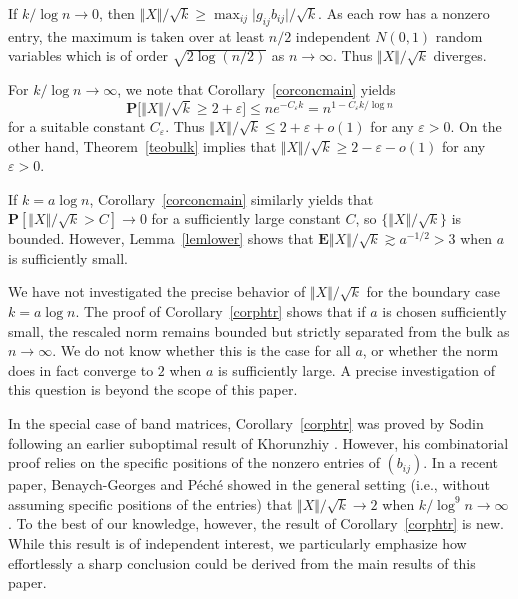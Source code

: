 \documentclass[aop,MSNbibl,dvips]{arximspdf}
\newcommand{\rrvert}{\vert}
\newcommand{\rrVert}{\Vert}
\newcommand{\llvert}{\vert}
\newcommand{\llVert}{\Vert}
\newcommand{\EE}{\mathbf{E}}
\begin{document}
\begin{pf}
If $k/\log n\to0$, then $\llVert X\rrVert /\sqrt{k}\ge
\max_{ij}\llvert g_{ij}b_{ij}\rrvert /\sqrt{k}$. As each row has a
nonzero entry,
the maximum is taken over at least $n/2$ independent $N(0,1)$ random
variables which is of order $\sqrt{2\log(n/2)}$ as $n\to\infty$.
Thus $\llVert X\rrVert /\sqrt{k}$ diverges.

For $k/\log n\to\infty$, we note that Corollary~\ref{corconcmain} yields
%
\[
\mathbf{P}\bigl[ \llVert X\rrVert/\sqrt{k}\ge2 + \varepsilon\bigr]
\le
ne^{-C_\varepsilon k} = n^{1-C_\varepsilon k/\log n} %
\]
%
for a suitable constant $C_\varepsilon$. Thus
$\llVert X\rrVert /\sqrt{k}\le2+\varepsilon+ o(1)$ for any
$\varepsilon>0$.
On the other hand, Theorem~\ref{teobulk}
implies that $\llVert X\rrVert /\sqrt{k}\ge2-\varepsilon-o(1)$ for any
$\varepsilon>0$.

If\vspace*{1pt} $k=a\log n$, Corollary~\ref{corconcmain} similarly yields
that $\mathbf{P}[\llVert X\rrVert /\sqrt{k} > C]\to0$ for a
sufficiently large
constant $C$, so $\{\llVert X\rrVert /\sqrt{k}\}$ is bounded. However,
Lemma~\ref{lemlower} shows that $\EE\llVert X\rrVert /\sqrt{k} \gtrsim
a^{-1/2}>3$ when $a$ is sufficiently small.
\end{pf}

%
\begin{rem}
We have not investigated the precise behavior of $\llVert X\rrVert
/\sqrt{k}$ for the
boundary case $k=a\log n$. The proof of Corollary~\ref{corphtr} shows
that if $a$ is chosen sufficiently small, the
rescaled norm remains bounded but strictly separated from the bulk as
$n\to\infty$. We do not know whether this is the case for all $a$, or
whether the norm does in fact converge to $2$ when $a$ is sufficiently
large. A precise investigation of this question is beyond the scope of
this paper.
\end{rem}

In the special case of band matrices, Corollary~\ref{corphtr} was proved
by Sodin \cite{Sod10} following an earlier suboptimal result of Khorunzhiy
\cite{Kho08}. However, his combinatorial proof relies on the specific
positions of the nonzero entries of $(b_{ij})$. In a recent paper,
Benaych-Georges and P\'ech\'e \cite{BGP14} showed in the general setting
(i.e., without assuming specific positions of the entries) that
$\llVert X\rrVert /\sqrt{k}\to2$ when $k/\log^{9} n\to\infty$. To the
best of our
knowledge, however, the result of Corollary~\ref{corphtr} is new. While
this result is of independent interest, we particularly
emphasize how effortlessly a sharp conclusion could be derived from the
main results of this paper.
\end{document}
